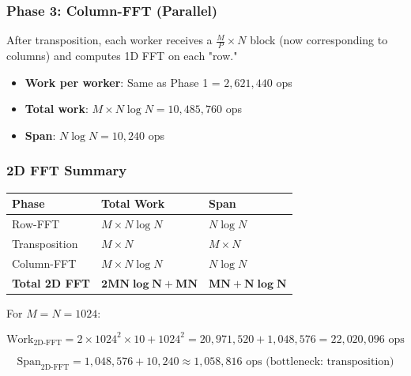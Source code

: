 \documentclass[11pt,a4paper]{article}
\begin{document}
\subsubsection{Phase 3: Column-FFT (Parallel)}

After transposition, each worker receives a $\frac{M}{P} \times N$ block (now corresponding to columns) and computes 1D FFT on each "row."

\begin{itemize}
    \item \textbf{Work per worker}: Same as Phase 1 = $2{,}621{,}440$ ops
    \item \textbf{Total work}: $M \times N \log N = 10{,}485{,}760$ ops
    \item \textbf{Span}: $N \log N = 10{,}240$ ops
\end{itemize}

\subsubsection{2D FFT Summary}

\begin{table}[h]
    \centering
    \begin{tabular}{lll}
        \hline
        \textbf{Phase} & \textbf{Total Work} & \textbf{Span} \\
        \hline
        Row-FFT & $M \times N \log N$ & $N \log N$ \\
        Transposition & $M \times N$ & $M \times N$ \\
        Column-FFT & $M \times N \log N$ & $N \log N$ \\
        \hline
        \textbf{Total 2D FFT} & $\mathbf{2MN \log N + MN}$ & $\mathbf{MN + N\log N}$ \\
        \hline
    \end{tabular}
\end{table}

For $M = N = 1024$:

\begin{equation}
\text{Work}_{\text{2D-FFT}} = 2 \times 1024^2 \times 10 + 1024^2 = 20{,}971{,}520 + 1{,}048{,}576 = 22{,}020{,}096 \text{ ops}
\end{equation}

\begin{equation}
\text{Span}_{\text{2D-FFT}} = 1{,}048{,}576 + 10{,}240 \approx 1{,}058{,}816 \text{ ops (bottleneck: transposition)}
\end{equation}
\end{document}
